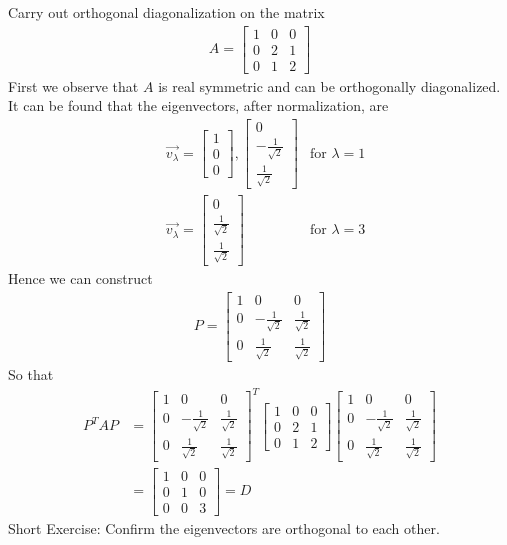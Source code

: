 \begin{exmp}
Carry out orthogonal diagonalization on the matrix
\begin{align*}
A =
\begin{bmatrix}
1 & 0 & 0 \\
0 & 2 & 1 \\
0 & 1 & 2
\end{bmatrix}
\end{align*}
First we observe that $A$ is real symmetric and can be orthogonally diagonalized. It can be found that the eigenvectors, after normalization, are
\begin{align*}
&\vec{v_\lambda} = 
\begin{bmatrix}
1 \\
0 \\
0
\end{bmatrix}
,
\begin{bmatrix}
0 \\
-\frac{1}{\sqrt{2}} \\
\frac{1}{\sqrt{2}}
\end{bmatrix}
& \text{for } \lambda = 1 \\
&\vec{v_\lambda} = 
\begin{bmatrix}
0 \\
\frac{1}{\sqrt{2}} \\
\frac{1}{\sqrt{2}}
\end{bmatrix}
& \text{for } \lambda = 3
\end{align*}
Hence we can construct
\begin{align*}
P =
\begin{bmatrix}
1 & 0 & 0 \\
0 & -\frac{1}{\sqrt{2}} & \frac{1}{\sqrt{2}} \\
0 & \frac{1}{\sqrt{2}} & \frac{1}{\sqrt{2}}
\end{bmatrix}
\end{align*}
So that
\begin{align*}
P^TAP &=
\begin{bmatrix}
1 & 0 & 0 \\
0 & -\frac{1}{\sqrt{2}} & \frac{1}{\sqrt{2}} \\
0 & \frac{1}{\sqrt{2}} & \frac{1}{\sqrt{2}}
\end{bmatrix}^T
\begin{bmatrix}
1 & 0 & 0 \\
0 & 2 & 1 \\
0 & 1 & 2
\end{bmatrix}
\begin{bmatrix}
1 & 0 & 0 \\
0 & -\frac{1}{\sqrt{2}} & \frac{1}{\sqrt{2}} \\
0 & \frac{1}{\sqrt{2}} & \frac{1}{\sqrt{2}}
\end{bmatrix} \\
&= 
\begin{bmatrix}
1 & 0 & 0\\
0 & 1 & 0\\
0 & 0 & 3 
\end{bmatrix} = D
\end{align*}
Short Exercise: Confirm the eigenvectors are orthogonal to each other.
\end{exmp}

